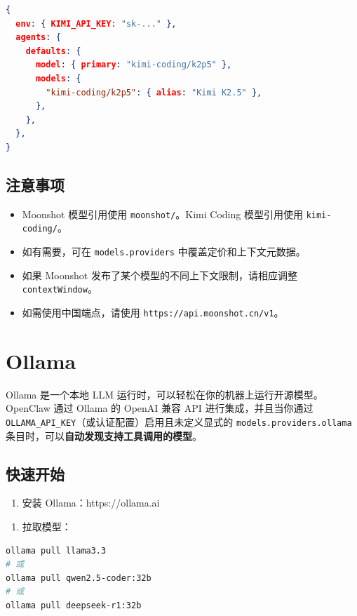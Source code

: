 \begin{lstlisting}[language=json]
{
  env: { KIMI_API_KEY: "sk-..." },
  agents: {
    defaults: {
      model: { primary: "kimi-coding/k2p5" },
      models: {
        "kimi-coding/k2p5": { alias: "Kimi K2.5" },
      },
    },
  },
}
\end{lstlisting}


\subsection{注意事项}


\begin{itemize}
  \item Moonshot 模型引用使用 \texttt{moonshot/}。Kimi Coding 模型引用使用 \texttt{kimi-coding/}。
  \item 如有需要，可在 \texttt{models.providers} 中覆盖定价和上下文元数据。
  \item 如果 Moonshot 发布了某个模型的不同上下文限制，请相应调整 \texttt{contextWindow}。
  \item 如需使用中国端点，请使用 \texttt{https://api.moonshot.cn/v1}。
\end{itemize}



\clearpage

\section{Ollama}


Ollama 是一个本地 LLM 运行时，可以轻松在你的机器上运行开源模型。OpenClaw 通过 Ollama 的 OpenAI 兼容 API 进行集成，并且当你通过 \texttt{OLLAMA\_API\_KEY}（或认证配置）启用且未定义显式的 \texttt{models.providers.ollama} 条目时，可以\textbf{自动发现支持工具调用的模型}。

\subsection{快速开始}


\begin{enumerate}
  \item 安装 Ollama：https://ollama.ai
\end{enumerate}


\begin{enumerate}
  \item 拉取模型：
\end{enumerate}


\begin{lstlisting}[language=bash]
ollama pull llama3.3
# 或
ollama pull qwen2.5-coder:32b
# 或
ollama pull deepseek-r1:32b
\end{lstlisting}


